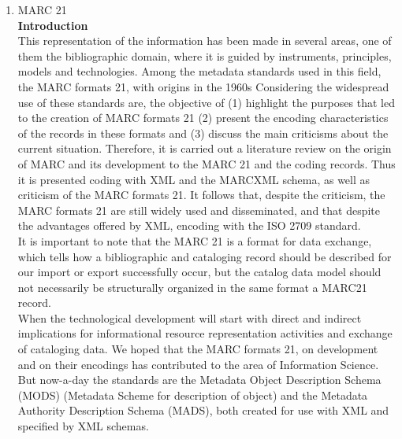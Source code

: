 \begin{enumerate}
	\item MARC 21\\
	{\bf Introduction}\\
	This representation of the information has been made in several areas, one of them the bibliographic domain, where it is guided by instruments, principles, models and technologies. Among the metadata standards used in this field, the MARC formats 21, with origins in the 1960s Considering the widespread use of these standards are, the objective of (1) highlight the purposes that led to the creation of MARC formats 21 (2) present the encoding characteristics of the records in these formats and (3) discuss the main criticisms about the current situation. Therefore, it is carried out a literature review on the origin of MARC and its development to the MARC 21 and the coding records. Thus it is presented coding with XML and the MARCXML schema, as well as criticism of the MARC formats 21. It follows that, despite the criticism, the MARC formats 21 are still widely used and disseminated, and that despite the advantages offered by XML, encoding with the ISO 2709 standard. \\
	It is important to note that the MARC 21 is a format for data exchange, which tells how a bibliographic and cataloging record should be described for our import or export successfully occur, but the catalog data model should not necessarily be structurally organized in the same format a MARC21 record. \\
	When the technological development will start with direct and indirect implications for informational resource representation activities and exchange of cataloging data. We hoped that the MARC formats 21, on development and on their encodings has contributed to the area of Information Science. \\
	But now-a-day the standards are the Metadata Object Description Schema (MODS) (Metadata Scheme for description of object) and the Metadata Authority Description Schema (MADS), both created for use with XML and specified by XML schemas.
	

\end{enumerate}

